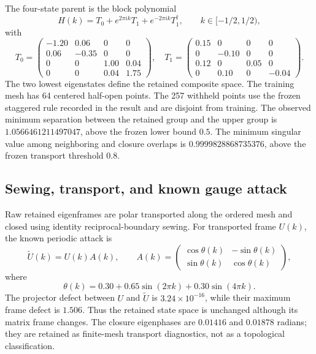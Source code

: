 The four-state parent is the block polynomial
\begin{equation}
 H(k)=T_0+e^{2\pi i k}T_1+e^{-2\pi i k}T_1^\dagger,
 \qquad k\in[-1/2,1/2),
 \label{eq:supp-m2-parent}
\end{equation}
with
\begin{equation}
 T_0=\begin{pmatrix}
 -1.20&0.06&0&0\\0.06&-0.35&0&0\\
 0&0&1.00&0.04\\0&0&0.04&1.75
 \end{pmatrix},\quad
 T_1=\begin{pmatrix}
 0.15&0&0&0\\0&-0.10&0&0\\
 0.12&0&0.05&0\\0&0.10&0&-0.04
 \end{pmatrix}.
 \label{eq:supp-m2-blocks}
\end{equation}
The two lowest eigenstates define the retained composite space. The training
mesh has 64 centered half-open points. The 257 withheld points use the frozen
staggered rule recorded in the result and are disjoint from training. The
observed minimum separation between the retained group and the upper group is
$1.0566461211497047$, above the frozen lower bound $0.5$. The minimum singular
value among neighboring and closure overlaps is
$0.9999828868735376$, above the frozen transport threshold $0.8$.

\subsection{Sewing, transport, and known gauge attack}

Raw retained eigenframes are polar transported along the ordered mesh and
closed using identity reciprocal-boundary sewing. For transported frame
$U(k)$, the known periodic attack is
\begin{equation}
 \widetilde U(k)=U(k)A(k),\qquad
 A(k)=\begin{pmatrix}\cos\theta(k)&-\sin\theta(k)\\
 \sin\theta(k)&\cos\theta(k)\end{pmatrix},
 \label{eq:supp-m2-attack}
\end{equation}
where
\begin{equation}
 \theta(k)=0.30+0.65\sin(2\pi k)+0.30\sin(4\pi k).
 \label{eq:supp-m2-angle}
\end{equation}
The projector defect between $U$ and $\widetilde U$ is
$3.24\times10^{-16}$, while their maximum frame defect is $1.506$.
Thus the retained state space is unchanged although its matrix frame changes.
The closure eigenphases are $0.01416$ and $0.01878$ radians; they are retained
as finite-mesh transport diagnostics, not as a topological classification.

